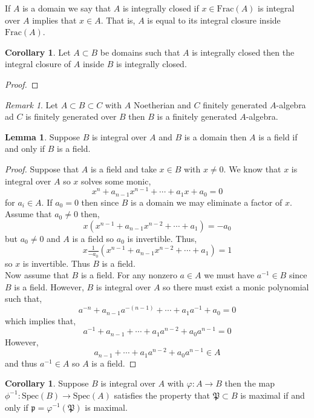\documentclass[12pt]{article}
\newcommand{\Frac}[1]{\mathrm{Frac}\left(#1\right)}
\newcommand{\spec}[1]{\mathrm{Spec}\left( #1 \right)}
\newcommand{\p}{\mathfrak{p}}
\theoremstyle{remark}
\newtheorem*{remark}{Remark}
\theoremstyle{definition}
\newtheorem{lemma}[theorem]{Lemma}
\newtheorem{corollary}[theorem]{Corollary}
\newenvironment{definition}[1][Definition:]{\begin{trivlist}
\item[\hskip \labelsep {\bfseries #1}]}{\end{trivlist}}
\begin{document}
\begin{definition}
If $A$ is a domain we say that $A$ is integrally closed if $x \in \Frac{A}$ is integral over $A$ implies that $x \in A$. That is, $A$ is equal to its integral closure inside $\Frac{A}$. 
\end{definition}

\begin{corollary}
Let $A \subset B$ be domains such that $A$ is integrally closed then the integral closure of $A$ inside $B$ is integrally closed.
\end{corollary}

\begin{proof}

\end{proof}

\begin{remark}
Let $A \subset B \subset C$ with $A$ Noetherian and $C$ finitely generated $A$-algebra ad $C$ is finitely generated over $B$ then $B$ is a finitely generated $A$-algebra. 
\end{remark}

\begin{lemma}
Suppose $B$ is integral over $A$ and $B$ is a domain then $A$ is a field if and only if $B$ is a field.
\end{lemma}

\begin{proof}
Suppose that $A$ is a field and take $x \in B$ with $x \neq 0$. We know that $x$ is integral over $A$ so $x$ solves some monic,
\[ x^n + a_{n-1} x^{n-1} + \cdots + a_1 x + a_0 = 0 \]
for $a_i \in A$. If $a_0 = 0$ then since $B$ is a domain we may eliminate a factor of $x$. Assume that $a_0 \neq 0$ then,
\[ x (x^{n-1} + a_{n-1} x^{n-2} + \cdots + a_1) = - a_0 \]
but $a_0 \neq 0$ and $A$ is a field so $a_0$ is invertible. Thus,
\[ x \tfrac{1}{-a_0} (x^{n-1} + a_{n-1} x^{n-2} + \cdots + a_1) = 1 \]
so $x$ is invertible. Thus $B$ is a field. 
\bigskip\\
Now assume that $B$ is a field. For any nonzero $a \in A$ we must have $a^{-1} \in B$ since $B$ is a field. However, $B$ is integral over $A$ so there must exist a monic polynomial such that,
\[ a^{-n} + a_{n-1} a^{-(n-1)} + \cdots + a_1 a^{-1} + a_0 = 0 \]
which implies that,
\[ a^{-1} + a_{n-1} + \cdots + a_1 a^{n-2} + a_0 a^{n-1} = 0 \]
However,
\[ a_{n-1} + \cdots + a_1 a^{n-2} + a_0 a^{n-1} \in A \]
and thus $a^{-1} \in A$ so $A$ is a field. 
\end{proof}

\begin{corollary}
Suppose $B$ is integral over $A$ with $\varphi : A \to B$ then the map $\phi^{-1} : \spec{B} \to \spec{A}$ satisfies the property that $\mathfrak{P} \subset B$ is maximal if and only if $\p = \varphi^{-1}(\mathfrak{P})$ is maximal. 
\end{corollary}
\end{document}
